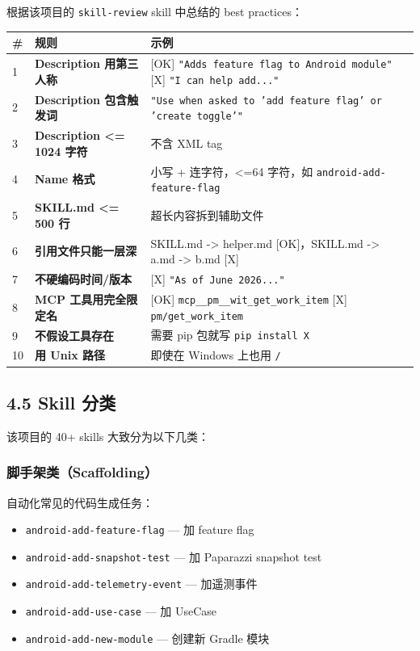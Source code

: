 根据该项目的 \texttt{skill-review} skill 中总结的 best practices：


\begingroup
\scriptsize
\setlength{\tabcolsep}{3pt}
\begin{longtable}{|p{}|p{}|p{}|}
\hline
\# & 规则 & 示例 \\ \hline
1 & \textbf{Description 用第三人称} & [OK] \texttt{"Adds feature flag to Android module"} [X] \texttt{"I can help add..."} \\ \hline
2 & \textbf{Description 包含触发词} & \texttt{"Use when asked to 'add feature flag' or 'create toggle'"} \\ \hline
3 & \textbf{Description <= 1024 字符} & 不含 XML tag \\ \hline
4 & \textbf{Name 格式} & 小写 + 连字符，<=64 字符，如 \texttt{android-add-feature-flag} \\ \hline
5 & \textbf{SKILL.md <= 500 行} & 超长内容拆到辅助文件 \\ \hline
6 & \textbf{引用文件只能一层深} & SKILL.md -> helper.md [OK]，SKILL.md -> a.md -> b.md [X] \\ \hline
7 & \textbf{不硬编码时间/版本} & [X] \texttt{"As of June 2026..."} \\ \hline
8 & \textbf{MCP 工具用完全限定名} & [OK] \texttt{mcp\_\_pm\_\_wit\_get\_work\_item} [X] \texttt{pm/get\_work\_item} \\ \hline
9 & \textbf{不假设工具存在} & 需要 pip 包就写 \texttt{pip install X} \\ \hline
10 & \textbf{用 Unix 路径} & 即使在 Windows 上也用 \texttt{/} \\ \hline
\end{longtable}
\endgroup

\subsection{4.5 Skill 分类}

该项目的 40+ skills 大致分为以下几类：


\subsubsection{脚手架类（Scaffolding）}
自动化常见的代码生成任务：

\begin{itemize}[leftmargin=2em]
\item \texttt{android-add-feature-flag} --- 加 feature flag
\item \texttt{android-add-snapshot-test} --- 加 Paparazzi snapshot test
\item \texttt{android-add-telemetry-event} --- 加遥测事件
\item \texttt{android-add-use-case} --- 加 UseCase
\item \texttt{android-add-new-module} --- 创建新 Gradle 模块
\end{itemize}

